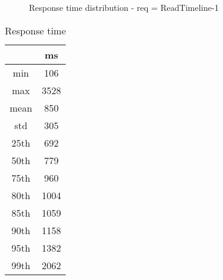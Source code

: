 \begin{minipage}{0.75\linewidth}
\begin{figure}[h]
\begin{adjustbox}{max width=1.0\linewidth, keepaspectratio}
  \end{adjustbox}
  \caption{Response time distribution - req = ReadTimeline-1}
\end{figure}
\end{minipage}\hfill\begin{minipage}{0.18\linewidth}
\begin{table}[h]
\begin{tabular}{|cc|}
\hline
\textbf{} & \textbf{ms}\\ \hline
 \Xhline{0.005\arrayrulewidth}
min & 106\\
 \Xhline{0.005\arrayrulewidth}
max & 3528\\
 \Xhline{0.005\arrayrulewidth}
mean & 850\\
 \Xhline{0.005\arrayrulewidth}
std & 305\\
\hline
\hline
 \Xhline{0.005\arrayrulewidth}
25th & 692\\
 \Xhline{0.005\arrayrulewidth}
50th & 779\\
 \Xhline{0.005\arrayrulewidth}
75th & 960\\
 \Xhline{0.005\arrayrulewidth}
80th & 1004\\
 \Xhline{0.005\arrayrulewidth}
85th & 1059\\
 \Xhline{0.005\arrayrulewidth}
90th & 1158\\
 \Xhline{0.005\arrayrulewidth}
95th & 1382\\
 \Xhline{0.005\arrayrulewidth}
99th & 2062\\
\hline
\end{tabular}
\caption{Response time}
\end{table}
\end{minipage}\hfill